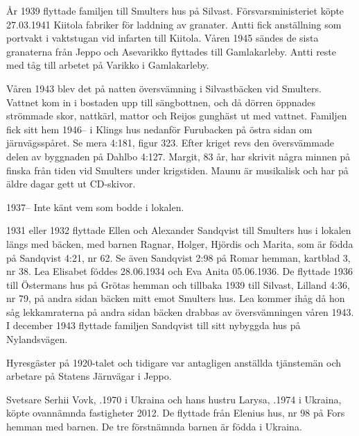År 1939 flyttade familjen till Smulters hus på Silvast. Försvarsministeriet köpte 27.03.1941 Kiitola fabriker för laddning av	granater. Antti fick anställning som portvakt i vaktstugan vid infarten till Kiitola. Våren 1945 sändes de sista granaterna från Jeppo och Asevarikko flyttades till Gamlakarleby. Antti reste med tåg till arbetet på Varikko i Gamlakarleby.

Våren 1943 blev det på natten översvämning i Silvastbäcken vid Smulters. Vattnet kom in i bostaden upp till sängbottnen, och då dörren öppnades strömmade skor, nattkärl, mattor och Reijos gunghäst ut med vattnet. Familjen fick sitt hem 1946-- i Klings hus nedanför Furubacken på östra sidan om 	järnvägsspåret. Se mera 4:181, figur 323. Efter kriget revs den översvämmade delen av byggnaden på Dahlbo 4:127. Margit, 83 år, har	skrivit några minnen på finska från tiden vid Smulters under krigstiden. Maunu är musikalisk och har på äldre dagar gett ut CD-skivor.

1937-- Inte känt vem som bodde i lokalen.

1931 eller 1932 flyttade Ellen och Alexander Sandqvist till Smulters	hus i lokalen längs med bäcken, med barnen Ragnar, Holger, Hjördis	och Marita, som är födda på Sandqvist 4:21, nr 62. Se även Sandqvist	2:98 på Romar hemman, kartblad 3, nr 38. Lea Elisabet föddes 28.06.1934 och Eva Anita 05.06.1936. De flyttade 1936 till Östermans hus på Grötas hemman och	tillbaka 1939 till Silvast, Lilland 4:36, nr 79, på andra sidan bäcken mitt emot Smulters hus. Lea kommer ihåg då hon såg lekkamraterna på andra sidan bäcken drabbas av översvämningen våren 1943. I december 1943 flyttade familjen Sandqvist till sitt nybyggda hus på Nylandsvägen.

Hyresgäster på 1920-talet och tidigare var antagligen anställda tjänstemän och arbetare på Statens Järnvägar i Jeppo.






Svetsare Serhii Vovk, .1970 i Ukraina och hans hustru Larysa, .1974 i Ukraina, köpte ovannämnda fastigheter 2012. De flyttade från Elenius hus, nr 98 på Fors hemman med barnen.	De tre förstnämnda barnen är födda i Ukraina.
\begin{jhchildren}
  \item {}
  \item {}
  \item {}
  \item {}
\end{jhchildren}

